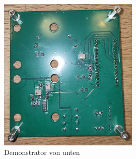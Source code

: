 \begin{figure}[H]
    \centering
    \includegraphics[width=0.6\textwidth]{graphics/photo_demonstrator_bottom.jpg}
    \caption{Demonstrator von unten}\label{fig:apdx_photo_demonstrator_bottom}
\end{figure}
